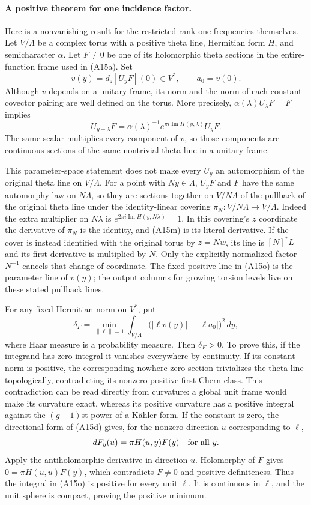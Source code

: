 \paragraph{A positive theorem for one incidence factor.}
Here is a nonvanishing result for the restricted rank-one frequencies
themselves.  Let $V/\Lambda$ be a complex torus with a positive theta
line, Hermitian form $H$, and semicharacter $\alpha$.  Let $F\ne0$
be one of its holomorphic theta sections in the entire-function
frame used in (A15a).  Set
\[
       v(y)=d_z[U_yF](0)\in V^*,\qquad a_0=v(0).
 \tag{A15m}
\]
Although $v$ depends on a unitary frame, its norm and the norm of
each constant covector pairing are well defined on the torus.
More precisely, $\alpha(\lambda)U_\lambda F=F$ implies
\[
 U_{y+\lambda}F
    =\alpha(\lambda)^{-1}
       e^{\pi i\operatorname{Im}H(y,\lambda)}U_yF.
 \tag{A15n}
\]
The same scalar multiplies every component of $v$, so those
components are continuous sections of the same nontrivial theta
line in a unitary frame.

This parameter-space statement does not make every $U_y$ an
automorphism of the original theta line on $V/\Lambda$.
For a point with $Ny\in\Lambda$, $U_yF$ and $F$ have the same
automorphy law on $N\Lambda$, so they are sections together on
$V/N\Lambda$ of the pullback of the original theta line under
the identity-linear covering
$\pi_N:V/N\Lambda\longrightarrow V/\Lambda$.
Indeed the extra multiplier on $N\lambda$ is
$e^{2\pi i\operatorname{Im}H(y,N\lambda)}=1$.
In this covering's $z$ coordinate the derivative of $\pi_N$ is
the identity, and (A15m) is its literal derivative.  If the cover
is instead identified with the original torus by $z=Nw$, its
line is $[N]^*L$ and its first derivative is multiplied by $N$.
Only the explicitly normalized factor $N^{-1}$ cancels that
change of coordinate.  The fixed positive line in (A15o) is
the parameter line of $v(y)$; the output columns for growing
torsion levels live on these stated pullback lines.

For any fixed Hermitian norm on $V^*$, put
\[
 \delta_F=\min_{\|\ell\|=1}
     \int_{V/\Lambda}
       \bigl(|\ell v(y)|-|\ell a_0|\bigr)^2\,dy,
 \tag{A15o}
\]
where Haar measure is a probability measure.  Then
$\delta_F>0$.  To prove this, if the integrand has zero integral
it vanishes everywhere by continuity.  If its constant norm is
positive, the corresponding nowhere-zero section trivializes the
theta line topologically, contradicting its nonzero positive
first Chern class.  This contradiction can be read directly from
curvature: a global unit frame would make its curvature exact,
whereas its positive curvature has a positive integral against
the $(g-1)$st power of a K\"ahler form.  If the constant is zero,
the directional form of (A15d) gives, for the nonzero direction
$u$ corresponding to $\ell$,
\[
             dF_y(u)=\pi H(u,y)F(y)\quad\hbox{for all }y.
\]
Apply the antiholomorphic derivative in direction $u$.  Holomorphy
of $F$ gives $0=\pi H(u,u)F(y)$, which contradicts $F\ne0$ and
positive definiteness.  Thus the integral in (A15o) is positive
for every unit $\ell$.  It is continuous in $\ell$, and the unit
sphere is compact, proving the positive minimum.

